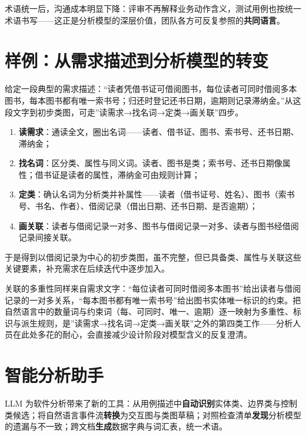 \documentclass[
]{ctexbook}
\providecommand{\tightlist}{\setlength{\itemsep}{0pt}\setlength{\parskip}{0pt} }
\begin{document}
术语统一后，沟通成本明显下降：评审不再解释业务动作含义，测试用例也按统一术语书写------这正是分析模型的深层价值，团队各方可反复参照的\textbf{共同语言}。

\section{样例：从需求描述到分析模型的转变}\label{ux6837ux4f8bux4eceux9700ux6c42ux63cfux8ff0ux5230ux5206ux6790ux6a21ux578bux7684ux8f6cux53d8}

给定一段典型的需求描述：``读者凭借书证可借阅图书，每位读者可同时借阅多本图书，每本图书都有唯一索书号；归还时登记还书日期，逾期则记录滞纳金。''从这段文字到初步类图，可走''读需求→找名词→定类→画关联''四步。

\begin{enumerate}
\def\labelenumi{\arabic{enumi}.}
\tightlist
\item
  \textbf{读需求}：通读全文，圈出名词------读者、借书证、图书、索书号、还书日期、滞纳金；
\item
  \textbf{找名词}：区分类、属性与同义词。读者、图书是类；索书号、还书日期像属性；借书证是读者的属性，滞纳金可由规则计算；
\item
  \textbf{定类}：确认名词为分析类并补属性------读者（借书证号、姓名）、图书（索书号、书名、作者）、借阅记录（借出日期、还书日期、是否逾期）；
\item
  \textbf{画关联}：读者与借阅记录一对多、图书与借阅记录一对多、读者与图书经借阅记录间接关联。
\end{enumerate}

于是得到以借阅记录为中心的初步类图，虽不完整，但已具备类、属性与关联这些关键要素，补充需求在后续迭代中逐步加入。

关联的多重性同样来自需求文字：``每位读者可同时借阅多本图书''给出读者与借阅记录的一对多关系，``每本图书都有唯一索书号''给出图书实体唯一标识的约束。把自然语言中的数量词与约束词（每、可同时、唯一、逾期）逐一映射为多重性、标识与派生规则，是''读需求→找名词→定类→画关联''之外的第四类工作------分析人员在此处多花的耐心，会直接减少设计阶段对模型含义的反复澄清。

\section{智能分析助手}\label{ux667aux80fdux5206ux6790ux52a9ux624b}

LLM
为软件分析带来了新的工具：从用例描述中\textbf{自动识别}实体类、边界类与控制类候选；将自然语言事件流\textbf{转换}为交互图与类图草稿；对照检查清单\textbf{发现}分析模型的遗漏与不一致；跨文档\textbf{生成}数据字典与词汇表，统一术语。
\end{document}
